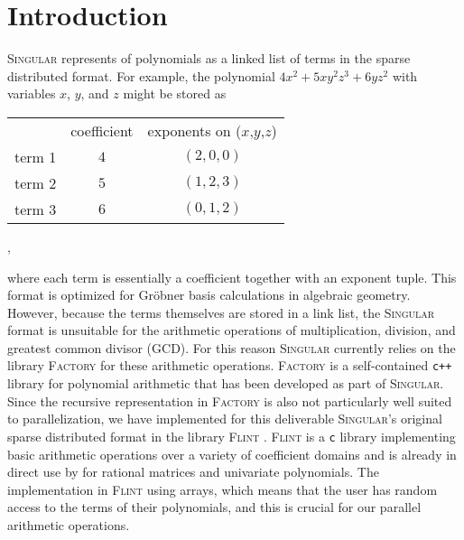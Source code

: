 \documentclass{deliverablereport}
\author{Daniel Schultz}
\begin{document}
\maketitle
\githubissuedescription


\section{Introduction}
\textsc{Singular} \cite{DGPS} represents of polynomials as a linked list of terms in the sparse distributed format. For example, the polynomial $4 x^2 + 5 x y^2 z^3 + 6 y z^2$ with variables $x$, $y$, and $z$ might be stored as
\begin{center}
\begin{tabular}{ccc}
 & coefficient & exponents on ($x$,$y$,$z$)\\
term 1 & $4$ & $(2,0,0)$\\
term 2 & $5$ & $(1,2,3)$\\
term 3 & $6$ & $(0,1,2)$
\end{tabular},
\end{center}
where each term is essentially a coefficient together with an exponent tuple. This format is optimized for Gr\"obner basis calculations in algebraic geometry. However, because the terms themselves are stored in a link list, the \textsc{Singular} format is unsuitable for the arithmetic operations of multiplication, division, and greatest common divisor (GCD). For this reason \textsc{Singular} currently relies on the library \textsc{Factory} \cite{Factory} for these arithmetic operations. \textsc{Factory} is a self-contained {\tt c++} library for polynomial arithmetic that has been developed as part of \textsc{Singular}. Since the recursive representation in \textsc{Factory} is also not particularly well suited to parallelization, we have implemented for this deliverable \textsc{Singular}'s original sparse distributed format in the library \textsc{Flint} \cite{Hart2010}. \textsc{Flint} is a {\tt c} library implementing basic arithmetic operations over a variety of coefficient domains and is already in direct use by \Sage for rational matrices and univariate polynomials. The implementation in \textsc{Flint} using arrays, which means that the user has random access to the terms of their polynomials, and this is crucial for our parallel arithmetic operations.
\end{document}
